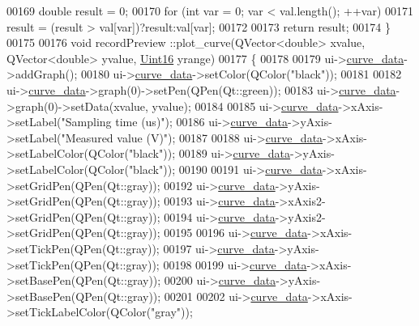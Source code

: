 \begin{DoxyCode}
00169     \textcolor{keywordtype}{double} result = 0;
00170     \textcolor{keywordflow}{for} (\textcolor{keywordtype}{int} var = 0; var < val.length(); ++var)
00171         result = (result > val[var])?result:val[var];
00172 
00173     \textcolor{keywordflow}{return} result;
00174 \}
00175 
00176 \textcolor{keywordtype}{void} recordPreview ::plot\_curve(QVector<double> xvalue, QVector<double> yvalue, 
      \hyperlink{a00001_aae7407b021d43f7193a81a58cfb3e297}{Uint16} yrange)
00177 \{
00178 
00179   ui->\hyperlink{a00028_a247d94481323c0bc4f8b6458a8a535dd}{curve\_data}->addGraph();
00180   ui->\hyperlink{a00028_a247d94481323c0bc4f8b6458a8a535dd}{curve\_data}->setColor(QColor(\textcolor{stringliteral}{"black"}));
00181 
00182   ui->\hyperlink{a00028_a247d94481323c0bc4f8b6458a8a535dd}{curve\_data}->graph(0)->setPen(QPen(Qt::green));
00183   ui->\hyperlink{a00028_a247d94481323c0bc4f8b6458a8a535dd}{curve\_data}->graph(0)->setData(xvalue, yvalue);
00184 
00185   ui->\hyperlink{a00028_a247d94481323c0bc4f8b6458a8a535dd}{curve\_data}->xAxis->setLabel(\textcolor{stringliteral}{"Sampling time (us)"});
00186   ui->\hyperlink{a00028_a247d94481323c0bc4f8b6458a8a535dd}{curve\_data}->yAxis->setLabel(\textcolor{stringliteral}{"Measured value (V)"});
00187 
00188   ui->\hyperlink{a00028_a247d94481323c0bc4f8b6458a8a535dd}{curve\_data}->xAxis->setLabelColor(QColor(\textcolor{stringliteral}{"black"}));
00189   ui->\hyperlink{a00028_a247d94481323c0bc4f8b6458a8a535dd}{curve\_data}->yAxis->setLabelColor(QColor(\textcolor{stringliteral}{"black"}));
00190 
00191   ui->\hyperlink{a00028_a247d94481323c0bc4f8b6458a8a535dd}{curve\_data}->xAxis->setGridPen(QPen(Qt::gray));
00192   ui->\hyperlink{a00028_a247d94481323c0bc4f8b6458a8a535dd}{curve\_data}->yAxis->setGridPen(QPen(Qt::gray));
00193   ui->\hyperlink{a00028_a247d94481323c0bc4f8b6458a8a535dd}{curve\_data}->xAxis2->setGridPen(QPen(Qt::gray));
00194   ui->\hyperlink{a00028_a247d94481323c0bc4f8b6458a8a535dd}{curve\_data}->yAxis2->setGridPen(QPen(Qt::gray));
00195 
00196   ui->\hyperlink{a00028_a247d94481323c0bc4f8b6458a8a535dd}{curve\_data}->xAxis->setTickPen(QPen(Qt::gray));
00197   ui->\hyperlink{a00028_a247d94481323c0bc4f8b6458a8a535dd}{curve\_data}->yAxis->setTickPen(QPen(Qt::gray));
00198 
00199   ui->\hyperlink{a00028_a247d94481323c0bc4f8b6458a8a535dd}{curve\_data}->xAxis->setBasePen(QPen(Qt::gray));
00200   ui->\hyperlink{a00028_a247d94481323c0bc4f8b6458a8a535dd}{curve\_data}->yAxis->setBasePen(QPen(Qt::gray));
00201 
00202   ui->\hyperlink{a00028_a247d94481323c0bc4f8b6458a8a535dd}{curve\_data}->xAxis->setTickLabelColor(QColor(\textcolor{stringliteral}{"gray"}));

\end{DoxyCode}
